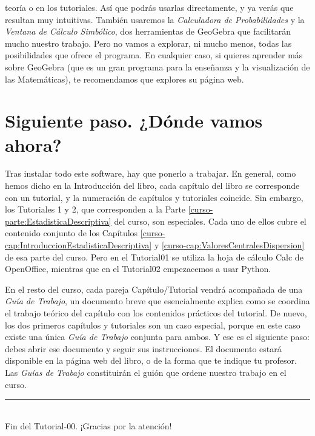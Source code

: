 \documentclass[10pt,a4paper]{article}\usepackage[]{graphicx}\usepackage[]{color}
\newcounter {cont01}
\begin{document}
teoría o en los tutoriales. Así que podrás usarlas directamente, y ya verás que resultan muy
intuitivas. También usaremos la {\em Calculadora de Probabilidades} y la {\em Ventana de Cálculo Simbólico}, dos herramientas de GeoGebra que facilitarán mucho nuestro trabajo. Pero no vamos a explorar, ni mucho menos, todas las posibilidades que ofrece el programa. En cualquier caso, si quieres aprender más sobre GeoGebra (que es un gran programa para la enseñanza y la visualización de las Matemáticas), te recomendamos que explores su página web.

\section{Siguiente paso. ¿Dónde vamos ahora?}

Tras instalar todo este software, hay que ponerlo a trabajar. En general, como hemos dicho en la Introducción del libro, cada capítulo del libro se corresponde con un tutorial, y la numeración de capítulos y tutoriales coincide. Sin embargo, los Tutoriales 1 y 2, que corresponden a la Parte \ref{curso-parte:EstadisticaDescriptiva} del curso, son especiales. Cada uno de ellos cubre el contenido conjunto de los Capítulos \ref{curso-cap:IntroduccionEstadisticaDescriptiva} y \ref{curso-cap:ValoresCentralesDispersion} de esa parte del curso. Pero en el Tutorial01 se utiliza la hoja de cálculo Calc de OpenOffice, mientras que en el Tutorial02 empezacemos a usar Python.

En el resto del curso, cada pareja Capítulo/Tutorial vendrá acompañada de una {\em Guía de Trabajo}, un documento breve que esencialmente explica como se coordina el trabajo teórico del capítulo con los contenidos prácticos del tutorial. De nuevo, los dos primeros capítulos y tutoriales son un caso especial, porque en este caso existe una única {\em Guía de Trabajo} conjunta para ambos. Y ese es el siguiente paso: debes abrir ese documento y seguir sus instrucciones. El documento estará disponible en la página web del libro, o de la forma que te indique tu profesor. Las {\em Guías de Trabajo} constituirán el guión que ordene nuestro trabajo en el curso.




\vspace{2cm} \hrule
\quad\\
Fin del Tutorial-00. ¡Gracias por la atención!
\end{document}
